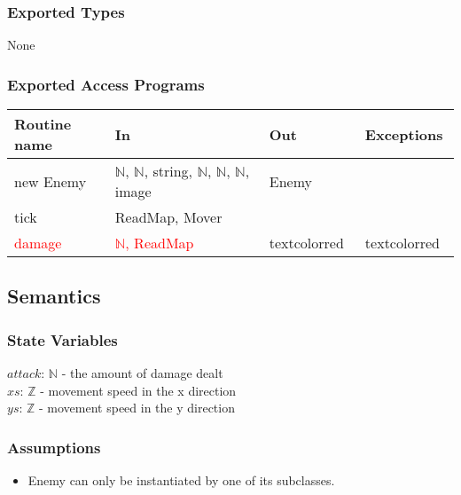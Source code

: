 \documentclass[12pt]{article}
\begin{document}

\subsubsection*{Exported Types}

None

\subsubsection*{Exported Access Programs}

\begin{tabular}{| l | l | l | l |}
\hline
\textbf{Routine name} & \textbf{In} & \textbf{Out} & \textbf{Exceptions}\\
\hline
new Enemy & $\mathbb{N}$, $\mathbb{N}$, string, $\mathbb{N}$, $\mathbb{N}$, $\mathbb{N}$, image & Enemy & ~\\
\hline
tick & ReadMap, Mover & ~ & ~\\
\hline
\textcolor{red}{damage} & \textcolor{red}{$\mathbb{N}$, ReadMap} & textcolor{red}{~} & textcolor{red}{~}\\
\hline
\end{tabular}

\subsection*{Semantics}

\subsubsection*{State Variables}

$attack$: $\mathbb{N}$ - the amount of damage dealt \\
$xs$: $\mathbb{Z}$ - movement speed in the x direction\\
$ys$: $\mathbb{Z}$ - movement speed in the y direction

\subsubsection*{Assumptions}

\begin{itemize}
    \item Enemy can only be instantiated by one of its subclasses.
\end{itemize}
\end{document}
